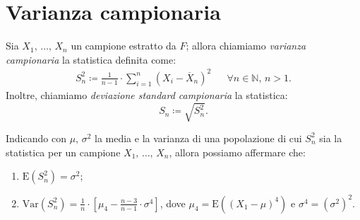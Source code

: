     \section{Varianza campionaria}
        \begin{defn}\label{defn:Varianza_campionaria}
            Sia $X_1,\, \ldots,\, X_{n}$ un campione estratto da $F$; allora chiamiamo 
            \emph{varianza campionaria} la statistica definita come:
            \begin{align}\label{eq:Varianza_campionaria}
                S_n^2 \coloneqq \frac{1}{n-1}\cdot \sum_{i=1}^{n} (X_i - \overline{X}_n)^2 
                & & \forall n \in \mathbb{N},\, n > 1
            .\end{align}
            Inoltre, chiamiamo \emph{deviazione standard campionaria} la statistica: \[
                S_n \coloneqq  \sqrt{S_n^2}
            .\]
        \end{defn}
        \begin{prty}
            Indicando con $\mu,\, \sigma^2$ la media e la varianza di una popolazione di cui $S_n^2$ 
            sia la statistica per un campione $X_1,\, \ldots,\, X_{n}$, allora possiamo affermare che:
            \begin{enumerate}
                \item $\text{E}(S_n^2) = \sigma^2$;
                \item $\text{Var}(S_n^2) = \frac{1}{n}\cdot[\mu_4 - \frac{n-3}{n-1}\cdot\sigma^4]$, dove
                    $\mu_4 = \text{E}((X_1-\mu)^4)$ e $\sigma^4 = (\sigma^2)^2$.
            \end{enumerate}
        \end{prty}
